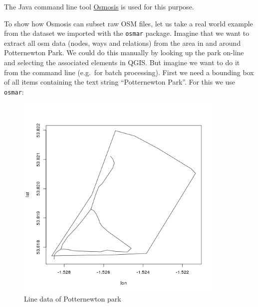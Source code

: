 \documentclass[]{article}
\newenvironment{Shaded}{}{}
\newcommand{\KeywordTok}[1]{\textcolor[rgb]{0.00,0.44,0.13}{\textbf{{#1}}}}
\newcommand{\DataTypeTok}[1]{\textcolor[rgb]{0.56,0.13,0.00}{{#1}}}
\newcommand{\StringTok}[1]{\textcolor[rgb]{0.25,0.44,0.63}{{#1}}}
\newcommand{\CommentTok}[1]{\textcolor[rgb]{0.38,0.63,0.69}{\textit{{#1}}}}
\newcommand{\NormalTok}[1]{{#1}}
\let\Oldincludegraphics\includegraphics
\renewcommand{\includegraphics}[1]{\Oldincludegraphics[width=10cm]{#1}}
\begin{document}
The Java command line tool
\href{http://wiki.openstreetmap.org/wiki/Osmosis}{Osmosis} is used for
this purpose.

To show how Osmosis can subset raw OSM files, let us take a real world
example from the dataset we imported with the \texttt{osmar} package.
Imagine that we want to extract all osm data (nodes, ways and relations)
from the area in and around Potternewton Park. We could do this manually
by looking up the park on-line and selecting the associated elements in
QGIS. But imagine we want to do it from the command line (e.g.~for batch
processing). First we need a bounding box of all items containing the
text string ``Potternewton Park''. For this we use \texttt{osmar}:

\begin{Shaded}
\end{Shaded}

\begin{figure}[htbp]
\centering
\includegraphics{figure/Line_data_of_Potternewton_park.png}
\caption{Line data of Potternewton park}
\end{figure}
\end{document}
